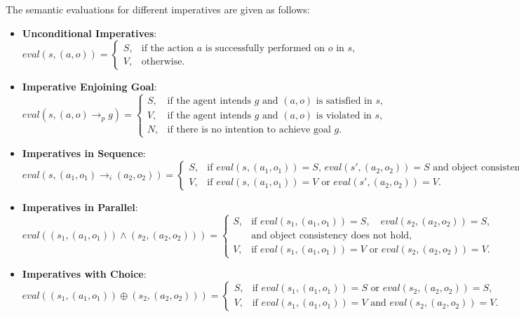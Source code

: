 \documentclass[a4paper,11pt]{lmcs}
\begin{document}
The semantic evaluations for different imperatives are given as follows:

\begin{itemize}
 \item \textbf{Unconditional Imperatives}:
\[
eval(s, (a, o)) =
\begin{cases}
S, & \text{if the action } a \text{ is successfully performed on } o \text{ in } s, \\
V, & \text{otherwise}.
\end{cases}
\]

\item \textbf{Imperative Enjoining Goal}:
\[
eval(s, (a, o) \rightarrow_p g) =
\begin{cases}
S, & \text{if the agent intends } g \text{ and } (a,o) \text{ is satisfied in } s, \\
V, & \text{if the agent intends } g \text{ and } (a,o) \text{ is violated in } s, \\
N, & \text{if there is no intention to achieve goal } g.
\end{cases}
\]

\item \textbf{Imperatives in Sequence}:
\[
eval(s, (a_1, o_1) \rightarrow_i (a_2, o_2)) =
\begin{cases}
S, & \text{if } eval(s, (a_1, o_1)) = S \text{, } eval(s', (a_2, o_2)) = S \text{ and object consistency holds,} \\
V, & \text{if } eval(s, (a_1, o_1)) = V \text{ or } eval(s', (a_2, o_2)) = V.
\end{cases}
\]

\item \textbf{Imperatives in Parallel}:
\[
eval((s_1, (a_1, o_1)) \wedge (s_2, (a_2, o_2))) =
\begin{cases}
S, & \text{if } eval(s_1, (a_1, o_1)) = S, \quad eval(s_2, (a_2, o_2)) = S, \\
& \text{and object consistency does not hold,} \\
V, & \text{if } eval(s_1, (a_1, o_1)) = V \text{ or } eval(s_2, (a_2, o_2)) = V.
\end{cases}
\]

\item \textbf{Imperatives with Choice}:
\[
eval((s_1, (a_1, o_1)) \oplus (s_2, (a_2, o_2))) =
\begin{cases}
S, & \text{if } eval(s_1, (a_1, o_1)) = S \text{ or } eval(s_2, (a_2, o_2)) = S, \\
V, & \text{if } eval(s_1, (a_1, o_1)) = V \text{ and } eval(s_2, (a_2, o_2)) = V.
\end{cases}
\]

\end{itemize}
\end{document}
